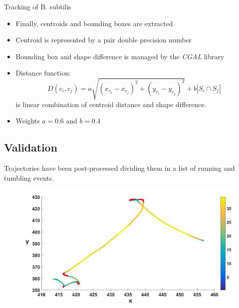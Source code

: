 \documentclass{beamer}
\begin{document}
	\begin{frame}{Tracking of B. subtilis}
				\begin{itemize}
					\item Finally, centroids and bounding boxes are extracted
					\item Centroid is represented by a pair double precision number
					\item Bounding box and shape difference is managed by the \textit{CGAL} library
					\item Distance function: 
					\begin{equation}
\label{sec:bacttracking}
D(c_i,c_j) = a \sqrt{(x_{c_i} - x_{c_j})^2 + (y_{c_i}-y_{c_j})^2} + b |S_i \cap S_j|
\end{equation}
is linear combination of centroid distance and shape difference.
\item Weights $a=0.6$ and $b=0.4$ 
					\end{itemize}
	\end{frame}
	

\subsection{Validation}


\begin{frame}
Trajectories have been post-processed dividing them  in a list of running and tumbling events.
		\begin{figure}
					\centering
					\includegraphics[scale=0.40]{./images/runtumble.png}
					
\end{figure}


				

\end{frame}
\end{document}
